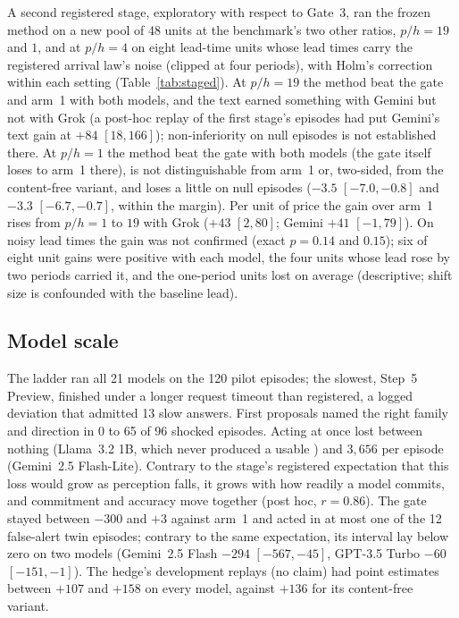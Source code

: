A second registered stage, exploratory with respect to Gate~3, ran the frozen method on a new
pool of 48 units at the benchmark's two other ratios, $p/h = 19$ and $1$, and at $p/h = 4$ on
eight lead-time units whose lead times carry the registered arrival law's noise (clipped at four
periods), with Holm's correction within each setting (Table~\ref{tab:staged}). At $p/h = 19$
the method beat the gate and arm~1 with both models, and the text earned something with Gemini
but not with Grok (a post-hoc replay of the first stage's episodes had put Gemini's text gain at
$+84$ $[18, 166]$); non-inferiority on null episodes is not established there. At $p/h = 1$ the
method beat the gate with both models (the gate itself loses to arm~1 there), is not
distinguishable from arm~1 or, two-sided, from the content-free variant, and loses a little on
null episodes ($-3.5$ $[-7.0, -0.8]$ and $-3.3$ $[-6.7, -0.7]$, within the margin). Per unit of
price the gain over arm~1 rises from $p/h = 1$ to $19$ with Grok ($+43$ $[2, 80]$; Gemini $+41$
$[-1, 79]$). On noisy lead times the gain was not confirmed (exact $p = 0.14$ and $0.15$); six
of eight unit gains were positive with each model, the four units whose lead rose by two periods
carried it, and the one-period units lost on average (descriptive; shift size is confounded with
the baseline lead).

\subsection{Model scale}

The ladder ran all 21 models on the 120 pilot episodes; the slowest, Step~5 Preview, finished
under a longer request timeout than registered, a logged deviation that admitted 13 slow answers.
First proposals named the right family and direction in 0 to 65 of 96 shocked episodes. Acting at once lost between nothing (Llama~3.2 1B, which never
produced a usable \shockspec{}) and $3{,}656$ per episode (Gemini~2.5 Flash-Lite). Contrary to the stage's
registered expectation that this loss would grow as perception falls, it grows with how readily
a model commits, and commitment and accuracy move together (post hoc, $r = 0.86$). The gate
stayed between $-300$ and $+3$ against arm~1 and acted in at most one of the 12 false-alert twin
episodes; contrary to the same expectation, its interval lay below zero on two models
(Gemini~2.5 Flash $-294$ $[-567, -45]$, GPT-3.5 Turbo $-60$ $[-151, -1]$). The hedge's
development replays (no claim) had point estimates between $+107$ and $+158$ on every model,
against $+136$ for its content-free variant.
